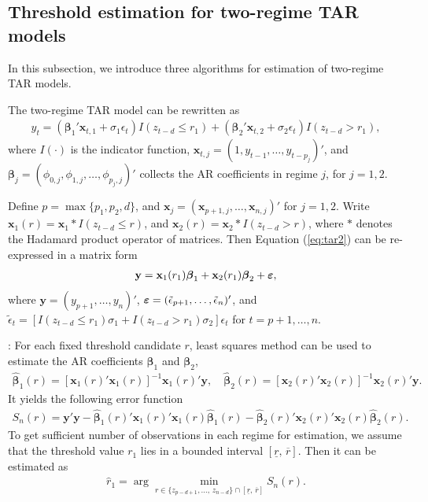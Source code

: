 \subsection{Threshold estimation for two-regime TAR models}
In this subsection, we introduce three algorithms for estimation of two-regime TAR models.

The two-regime TAR model can be rewritten as
\begin{align}\label{eq:tar2}
y_t=({\boldsymbol{\beta}}_1' {\mathbf x}_{t,1}+\sigma_1\epsilon_t) I(z_{t-d} \leq r_1) +({\boldsymbol{\beta}}_2' {\mathbf x}_{t,2}+\sigma_2 \epsilon_t)I(z_{t-d} > r_1),
\end{align}
where  $I(\cdot)$ is the indicator function, ${\mathbf x}_{t,j}=(1,y_{t-1},\ldots,y_{t-p_j})'$, and $\boldsymbol{\beta}_j=(\phi_{0,j},\phi_{1,j}, \ldots,\phi_{p_j,j})'$ collects the AR coefficients in regime $j$, for $j=1,2$. 

Define $p=\max\{p_1,p_2, d\}$, and ${\mathbf x}_j=({\mathbf x}_{p+1,j},\ldots, {\mathbf x}_{n,j})'$ for $j=1,2$. Write ${\mathbf x}_1(r)={\mathbf x}_1 * I(z_{t-d}\leq r)$, and ${\mathbf x}_2(r)={\mathbf x}_2 * I(z_{t-d}>r)$, where $*$ denotes the Hadamard product operator of matrices. Then Equation (\ref{eq:tar2}) can be re-expressed in a matrix form
\begin{align}\label{eq:tar_mat}
{\mathbf y}={\mathbf x}_1(r_1) \boldsymbol{\beta}_1+{\mathbf x}_2(r_1)\boldsymbol{\beta}_2+\mbox{\boldmath$\varepsilon$},
\end{align}
where ${\mathbf y}=(y_{p+1},\ldots,y_n)'$, $\mbox{\boldmath$\varepsilon$}=(\tilde{\epsilon}_{p+1},\ldots,\tilde{\epsilon}_n)'$, and $\tilde{\epsilon}_t=[I(z_{t-d}\leq r_1) \sigma_1+I(z_{t-d}>r_1) \sigma_2]\epsilon_t$ for $t=p+1,\ldots, n$.

: For each fixed threshold candidate $r$, least squares method can be used to estimate the AR coefficients $\boldsymbol{\beta}_1$ and $\boldsymbol{\beta}_2$,
\begin{align}\label{eq:beta}
\hat{\boldsymbol{\beta}}_1(r)= [{\mathbf x}_1(r)' {\mathbf x}_1(r)]^{-1}{\mathbf x}_1(r)' {\mathbf y}, \quad \hat{\boldsymbol{\beta}}_2(r)= [{\mathbf x}_2(r)' {\mathbf x}_2(r)]^{-1}{\mathbf x}_2(r)' {\mathbf y}.
\end{align}
It yields the following error function
\begin{align}\label{eq:Sn}
S_n(r)={\mathbf y}' {\mathbf y}- \hat{\boldsymbol{\beta}}_1(r)'{\mathbf x}_1(r)' {\mathbf x}_1(r) \hat{\boldsymbol{\beta}}_1(r) - \hat{\boldsymbol{\beta}}_2(r)'{\mathbf x}_2(r)' {\mathbf x}_2(r) \hat{\boldsymbol{\beta}}_2(r).
\end{align}
To get sufficient number of observations in each regime for estimation, we assume that the threshold value $r_1$ lies in a bounded interval $[\underline{r}, \,\overline{r}]$. Then it can be estimated as
\begin{align}\label{eq:obj}
\hat{r}_1=\arg \min_{r \in \{z_{p-d+1},\ldots,\, z_{n-d}\} \cap [\underline{r},\, \overline{r}]} S_n(r).
\end{align}

